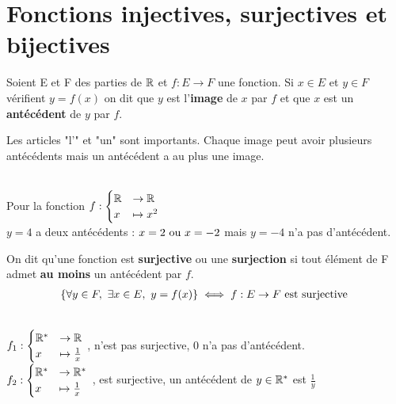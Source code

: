 \section{Fonctions injectives, surjectives et bijectives}

\begin{graybox}
	\begin{definition}
		Soient E et F des parties de $\mathbb{R}$ et $f:E \to F$ une fonction.
		Si $x \in E$ et $y \in F$ vérifient $y = f(x)$ on dit que $y$ est l'\textbf{image} de $x$ par $f$ et que $x$ est un \textbf{antécédent} de $y$ par $f$.
	\end{definition}
\end{graybox}

\begin{remarque}
	Les articles "l'" et "un" sont importants. Chaque image peut avoir plusieurs antécédents mais un antécédent a au plus une image.
\end{remarque}

\begin{exemple}~
	\\
	Pour la fonction 
	$
	f :
	\begin{cases}
		\mathbb{R} &\to \mathbb{R} \\
		x &\mapsto x^2
	\end{cases}
	$
	\\ 
	$y = 4$ \textnormal{a deux antécédents} : $x = 2 \textnormal{ ou } x = -2$ mais $y = -4$  n'a pas d'antécédent.
\end{exemple}

\begin{graybox}
	\begin{definition}[Surjectivité]
		On dit qu'une fonction est \textbf{surjective} ou une \textbf{surjection} si tout élément de F admet \textbf{au moins} un antécédent par $f$.
		\begin{align*}
			\{\forall y \in F,\ \exists x \in E,\ y = f(x)\} \iff f : E \to F \textnormal{ est surjective }
		\end{align*}
	\end{definition}
\end{graybox}

\begin{exemple}~
	\\
	$
	f_1 : 
	\begin{cases}
		\mathbb{R}^* &\to \mathbb{R} \\
		x &\mapsto \frac{1}{x}
	\end{cases}
	$
	, n'est pas surjective, 0 n'a pas d'antécédent. 
	\\
	$
	f_2 : 
	\begin{cases}
		\mathbb{R}^* &\to \mathbb{R}^* \\
		x &\mapsto \frac{1}{x}
	\end{cases}
	$
	, est surjective, un antécédent de $y \in \mathbb{R}^*$ est $\frac{1}{y}$
\end{exemple}

